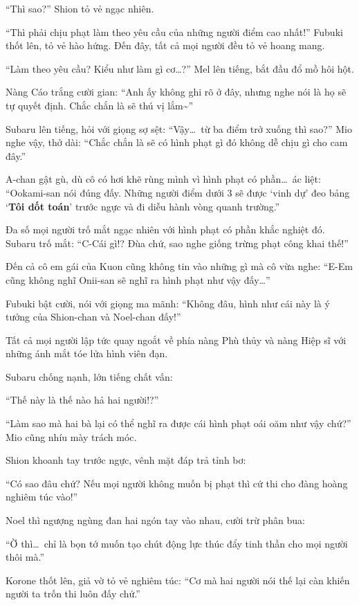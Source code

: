 \documentclass[../main.tex]{subfiles}
\begin{document}
``Thì sao?'' Shion tỏ vẻ ngạc nhiên.

``Thì phải chịu phạt làm theo yêu cầu của những người điểm cao nhất!'' Fubuki thốt lên, tỏ vẻ hào hứng. Đến đây, tất cả mọi người đều tỏ vẻ hoang mang.

``Làm theo yêu cầu? Kiểu như làm gì cơ\dots?'' Mel lên tiếng, bắt đầu đổ mồ hôi hột.

Nàng Cáo trắng cười gian: ``Anh ấy không ghi rõ ở đây, nhưng nghe nói là họ sẽ tự quyết định. Chắc chắn là sẽ thú vị lắm\~{}''

Subaru lên tiếng, hỏi với giọng sợ sệt: ``Vậy\dots\ từ ba điểm trở xuống thì sao?'' Mio nghe vậy, thở dài: ``Chắc chắn là sẽ có hình phạt gì đó không dễ chịu gì cho cam đây.''

A-chan gật gù, dù cô có hơi khẽ rùng mình vì hình phạt có phần\dots\ ác liệt: ``Ookami-san nói đúng đấy. Những người điểm dưới 3 sẽ được `vinh dự' đeo bảng `\textbf{Tôi dốt toán}' trước ngực và đi diễu hành vòng quanh trường.''

Đa số mọi người trố mắt ngạc nhiên với hình phạt có phần khắc nghiệt đó. Subaru trố mắt: ``C-Cái gì!? Đùa chứ, sao nghe giống trừng phạt công khai thế!''

Đến cả cô em gái của Kuon cũng không tin vào những gì mà cô vừa nghe: ``E-Em cũng không nghĩ Onii-san sẽ nghĩ ra hình phạt như vậy đấy\dots''

Fubuki bật cười, nói với giọng ma mãnh: ``Không đâu, hình như cái này là ý tưởng của Shion-chan và Noel-chan đấy!''

Tất cả mọi người lập tức quay ngoắt về phía nàng Phù thủy và nàng Hiệp sĩ với những ánh mắt tóe lửa hình viên đạn.

Subaru chống nạnh, lớn tiếng chất vấn:

``Thế này là thế nào hả hai người!?''

``Làm sao mà hai bà lại có thể nghĩ ra được cái hình phạt oái oăm như vậy chứ?'' Mio cũng nhíu mày trách móc.

Shion khoanh tay trước ngực, vênh mặt đáp trả tỉnh bơ:

``Có sao đâu chứ? Nếu mọi người không muốn bị phạt thì cứ thi cho đàng hoàng nghiêm túc vào!''

Noel thì ngượng ngùng đan hai ngón tay vào nhau, cười trừ phân bua:

``Ờ thì\dots\ chỉ là bọn tớ muốn tạo chút động lực thúc đẩy tinh thần cho mọi người thôi mà.''

Korone thốt lên, giả vờ tỏ vẻ nghiêm túc: ``Cơ mà hai người nói thế lại càn khiến người ta trốn thi luôn đấy chứ.''
\end{document}
